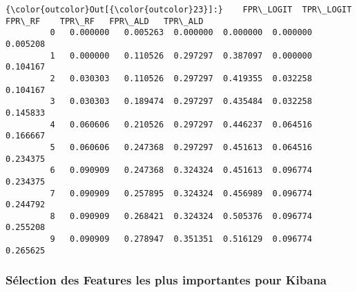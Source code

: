 \documentclass[11pt]{article}
\begin{document}
\begin{Verbatim}[commandchars=\\\{\}]
{\color{outcolor}Out[{\color{outcolor}23}]:}    FPR\_LOGIT  TPR\_LOGIT    FPR\_RF    TPR\_RF   FPR\_ALD   TPR\_ALD
         0   0.000000   0.005263  0.000000  0.000000  0.000000  0.005208
         1   0.000000   0.110526  0.297297  0.387097  0.000000  0.104167
         2   0.030303   0.110526  0.297297  0.419355  0.032258  0.104167
         3   0.030303   0.189474  0.297297  0.435484  0.032258  0.145833
         4   0.060606   0.210526  0.297297  0.446237  0.064516  0.166667
         5   0.060606   0.247368  0.297297  0.451613  0.064516  0.234375
         6   0.090909   0.247368  0.324324  0.451613  0.096774  0.234375
         7   0.090909   0.257895  0.324324  0.456989  0.096774  0.244792
         8   0.090909   0.268421  0.324324  0.505376  0.096774  0.255208
         9   0.090909   0.278947  0.351351  0.516129  0.096774  0.265625
\end{Verbatim}
            
    \hypertarget{suxe9lection-des-features-les-plus-importantes-pour-kibana}{%
\subsubsection{Sélection des Features les plus importantes pour
Kibana}\label{suxe9lection-des-features-les-plus-importantes-pour-kibana}}
\end{document}
